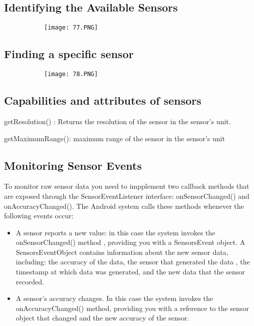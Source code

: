 \documentclass{article}
\begin{document}
  \vspace{50mm}

\subsection{Identifying the Available Sensors}

    \begin{figure}[ht!]
  \centering
  \begin{subfigure}[b]{1\linewidth}
  \texttt{[image: 77.PNG]}
  \end{subfigure}
  \end{figure}

  \vspace{50mm}

  \subsection{Finding a specific sensor}

      \begin{figure}[ht!]
  \centering
  \begin{subfigure}[b]{1\linewidth}
  \texttt{[image: 78.PNG]}
  \end{subfigure}
  \end{figure}

  \subsection{Capabilities and attributes of sensors}

  getResolution() : Returns the resolution of the sensor in the sensor's unit.

  getMaximumRange(): maximum range of the sensor in the sensor's unit

  \subsection{Monitoring Sensor Events}

  To monitor raw sensor data you need to impplement two callback methods that are exposed through the SensorEventListener interface: onSensorChanged() and onAccuracyChanged(). The Android system calls these methods whenever the following events occur:

  \begin{itemize}
      \item A sensor reports a new value: in this case the system invokes the onSensorChanged() method , providing you with a SensorsEvent object. A SensorsEventObject contains information about the new sensor data, including: the accuracy of the data, the sensor that generated the data , the timestamp at which data was generated, and the new data that the sensor recorded.

      \item A sensor's accuracy changes. In this case the system invokes the onAccuracyChanged() method, providing you with a reference to the sensor object that changed and the new accuracy of the sensor.
  \end{itemize}
\end{document}
